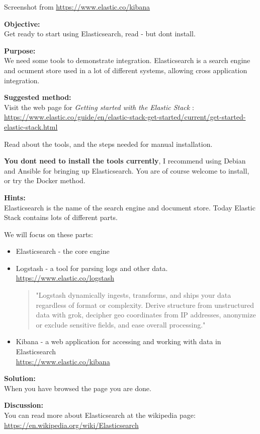 \documentclass[a4paper,11pt,notitlepage]{report}
\begin{document}
Screenshot from \url{https://www.elastic.co/kibana}

{\bf Objective:}\\
Get ready to start using Elasticsearch, read - but dont install.

{\bf Purpose:}\\
We need some tools to demonstrate integration. Elasticsearch is a search engine and ocument store used in a lot of different systems, allowing cross application integration.


{\bf Suggested method:}\\
Visit the web page for \emph{Getting started with the Elastic Stack} :\\
{\footnotesize\url{https://www.elastic.co/guide/en/elastic-stack-get-started/current/get-started-elastic-stack.html}}

Read about the tools, and the steps needed for manual installation.

{\bf You dont need to install the tools currently}, I recommend using Debian and Ansible for bringing up Elasticsearch.
You are of course welcome to install, or try the Docker method.


{\bf Hints:}\\
Elasticsearch is the name of the search engine and document store. Today Elastic Stack contains lots of different parts.

We will focus on these parts:
\begin{itemize}
\item Elasticsearch - the core engine
\item Logstash - a tool for parsing logs and other data.\\
\url{https://www.elastic.co/logstash}
\begin{quote}
"Logstash dynamically ingests, transforms, and ships your data regardless of format or complexity. Derive structure from unstructured data with grok, decipher geo coordinates from IP addresses, anonymize or exclude sensitive fields, and ease overall processing."
\end{quote}
\item Kibana - a web application for accessing and working with data in Elasticsearch\\
\url{https://www.elastic.co/kibana}
\end{itemize}

{\bf Solution:}\\
When you have browsed the page you are done.

{\bf Discussion:}\\
You can read more about Elasticsearch at the wikipedia page:\\
\url{https://en.wikipedia.org/wiki/Elasticsearch}
\end{document}
